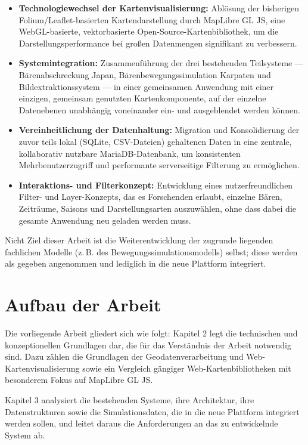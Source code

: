 \documentclass[12pt,a4paper]{report}
\begin{document}
\begin{itemize}
    \item \textbf{Technologiewechsel der Kartenvisualisierung:} Ablösung der bisherigen Folium/Leaflet-basierten Kartendarstellung durch MapLibre GL JS, eine WebGL-basierte, vektorbasierte Open-Source-Kartenbibliothek, um die Darstellungsperformance bei großen Datenmengen signifikant zu verbessern.
    \item \textbf{Systemintegration:} Zusammenführung der drei bestehenden Teilsysteme — Bärenabschreckung Japan, Bärenbewegungssimulation Karpaten und Bildextraktionssystem — in einer gemeinsamen Anwendung mit einer einzigen, gemeinsam genutzten Kartenkomponente, auf der einzelne Datenebenen unabhängig voneinander ein- und ausgeblendet werden können.
    \item \textbf{Vereinheitlichung der Datenhaltung:} Migration und Konsolidierung der zuvor teils lokal (SQLite, CSV-Dateien) gehaltenen Daten in eine zentrale, kollaborativ nutzbare MariaDB-Datenbank, um konsistenten Mehrbenutzerzugriff und performante serverseitige Filterung zu ermöglichen.
    \item \textbf{Interaktions- und Filterkonzept:} Entwicklung eines nutzerfreundlichen Filter- und Layer-Konzepts, das es Forschenden erlaubt, einzelne Bären, Zeiträume, Saisons und Darstellungsarten auszuwählen, ohne dass dabei die gesamte Anwendung neu geladen werden muss.
\end{itemize}

Nicht Ziel dieser Arbeit ist die Weiterentwicklung der zugrunde liegenden fachlichen Modelle (z.\,B. des Bewegungssimulationsmodells) selbst; diese werden als gegeben angenommen und lediglich in die neue Plattform integriert.

\section{Aufbau der Arbeit}

Die vorliegende Arbeit gliedert sich wie folgt: Kapitel 2 legt die technischen und konzeptionellen Grundlagen dar, die für das Verständnis der Arbeit notwendig sind. Dazu zählen die Grundlagen der Geodatenverarbeitung und Web-Kartenvisualisierung sowie ein Vergleich gängiger Web-Kartenbibliotheken mit besonderem Fokus auf MapLibre GL JS.

Kapitel 3 analysiert die bestehenden Systeme, ihre Architektur, ihre Datenstrukturen sowie die Simulationsdaten, die in die neue Plattform integriert werden sollen, und leitet daraus die Anforderungen an das zu entwickelnde System ab.
\end{document}
